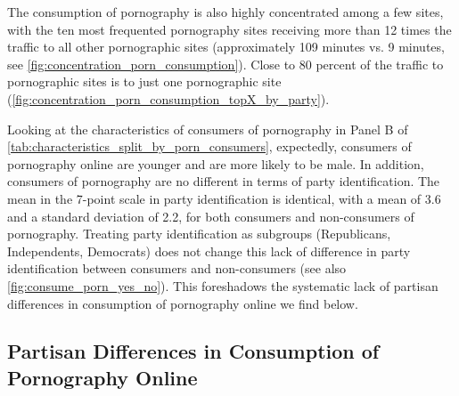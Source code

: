 \documentclass[12pt, letterpaper]{article}
\begin{document}
The consumption of pornography is also highly concentrated among a few sites, with the ten most frequented pornography sites receiving more than 12 times the traffic to all other pornographic sites (approximately 109 minutes vs. 9 minutes, see \cref{fig:concentration_porn_consumption}). Close to 80 percent of the traffic to pornographic sites is to just one pornographic site (\cref{fig:concentration_porn_consumption_topX_by_party}). 

Looking at the characteristics of consumers of pornography in Panel B of \cref{tab:characteristics_split_by_porn_consumers}, expectedly, consumers of pornography online are younger and are more likely to be male. 
In addition, consumers of pornography are no different in terms of party identification. The mean in the 7-point scale in party identification is identical, with a mean of 3.6 and a standard deviation of 2.2, for both consumers and non-consumers of pornography. Treating party identification as subgroups (Republicans, Independents, Democrats) does not change this lack of difference in party identification between consumers and non-consumers (see also \cref{fig:consume_porn_yes_no}). This foreshadows the systematic lack of partisan differences in consumption of pornography online we find below.


\subsection*{Partisan Differences in Consumption of Pornography Online}
\end{document}
